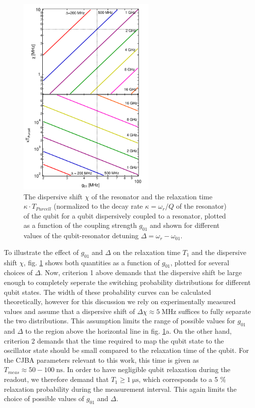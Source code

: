 \begin{figure}
	\includegraphics[width=0.6\textwidth]{./material/mathematica/readout_purcell_and_chi_vs_g}
	\caption[]{The dispersive shift $\chi$ of the resonator and the relaxation time $\kappa\cdot T_{Purcell}$ (normalized to the decay rate $\kappa=\omega_r/Q$ of the resonator) of the qubit for a qubit dispersively coupled to a resonator, plotted as a function of the coupling strength $g_{01}$ and shown for different values of the qubit-resonator detuning $\Delta = \omega_{r}-\omega_{01}$.}
	\label{fig:purcell_rate_and_chi}
\end{figure}


To illustrate the effect of $g_{01}$ and $\Delta$ on the relaxation time $T_1$ and the dispersive shift $\chi$, fig. \ref{fig:purcell_rate_and_chi} shows both quantities as a function of $g_{01}$, plotted for several choices of $\Delta$. Now, criterion 1 above demands that the dispersive shift be large enough to completely seperate the switching probability distributions for different qubit states. The width of these probability curves can be calculated theoretically, however for this discussion we rely on experimentally measured values and assume that a dispersive shift of $\Delta \chi \approx 5\;\mathrm{MHz}$ suffices to fully separate the two distributions. This assumption limits the range of possible values for $g_{01}$ and $\Delta$ to the region above the horizontal line in fig. \ref{fig:purcell_rate_and_chi}a. On the other hand, criterion 2 demands that the time required to map the qubit state to the oscillator state should be small compared to the relaxation time of the qubit. For the CJBA parameters relevant to this work, this time is given as $T_{meas}\approx 50-100\;\mathrm{ns}$. In order to have negligible qubit relaxation during the readout, we therefore demand that $T_1 \ge 1\;\mathrm{\mu s}$, which corresponds to a 5 \% relaxation probability during the measurement interval. This again limits the choice of possible values of $g_{01}$ and $\Delta$. 

